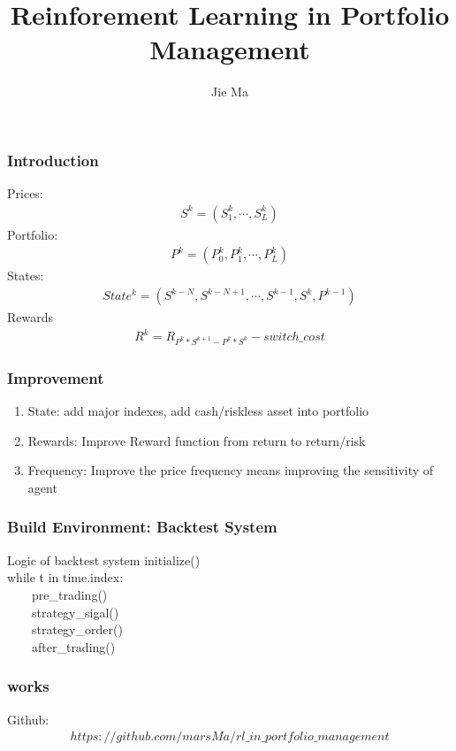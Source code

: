 \documentclass[11pt]{beamer}
\author{Jie Ma}
\title{Reinforement Learning in Portfolio Management}
\begin{document}
\frame{\titlepage}

\begin{frame}[c]\frametitle{Introduction}
    Prices:
    \begin{align*}
        S^{k}=(S_{1}^{k},\cdots,S_{L}^{k})
    \end{align*}
    Portfolio:
    \begin{align*}
        P^{k}=(P_{0}^{k},P_{1}^{k},\cdots,P_{L}^{k})
    \end{align*}
    States:
    \begin{align*}
        State^{k}=(S^{k-N},S^{k-N+1},\cdots,S^{k-1},S^{k},P^{k-1})
    \end{align*}
    Rewards
    \begin{align*}
        R^{k}=R_{P^{k}*S^{k+1}-P^{k}*S^{k}}-switch\_cost
    \end{align*}
\end{frame}

\begin{frame}[c]\frametitle{Improvement}
    \begin{enumerate}
        \item State: add major indexes, add cash/riskless asset into portfolio
        \item Rewards: Improve Reward function from return to return/risk
        \item Frequency: Improve the price frequency means improving the sensitivity of agent
    \end{enumerate}
\end{frame}

\begin{frame}[c]\frametitle{Build Environment: Backtest System}
    \begin{block}{Logic of backtest system}
    initialize()\\
    while t in time.index:\\ \ \ \ \ pre\_trading()\\ \ \ \ \ strategy\_sigal()\\ \ \ \ \  strategy\_order()\\ \ \ \ \ after\_trading()
    \end{block}
\end{frame}

\begin{frame}[c]\frametitle{works}
Github:
\begin{align*}
    https://github.com/marsMa/rl\_in\_portfolio\_management
\end{align*}

\end{frame}
\end{document}
